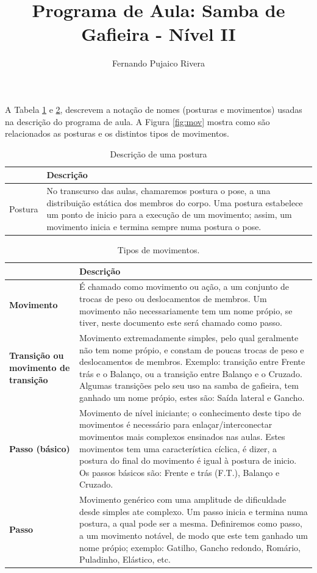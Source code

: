 \documentclass{article}
\title{Programa de Aula: Samba de Gafieira - Nível II}
\author{Fernando Pujaico Rivera}
\date{}
\begin{document}
{\let\newpage\relax\maketitle}
A Tabela \ref{tab:typospos} e \ref {tab:typosmov}, descrevem a notação de nomes  (posturas e movimentos) usadas 
na descrição do programa de aula.
A Figura \ref{fig:mov} mostra como são relacionados as posturas e os distintos tipos de movimentos.


\begin{table}[h]
\centering
\begin{tabular}{|p{3cm}|p{13cm}|}
\hline
~ & Descrição \\  \hline
Postura & No transcurso das aulas, chamaremos postura o pose, a una distribuição estática
dos membros do corpo. Uma postura estabelece um ponto de inicio para a execução de um
movimento; assim, um movimento inicia e termina sempre numa postura o pose.\\ \hline

\end{tabular}
\caption{Descrição de uma postura}
\label{tab:typospos}
\end{table}


\begin{table}[h]
\centering
\begin{tabular}{|p{2.5cm}|p{13.5cm}|}
\hline
~ & Descrição \\  \hline
\textbf{Movimento} & É chamado como movimento ou ação, a um conjunto de trocas de peso ou deslocamentos de membros.
Um movimento não necessariamente tem um nome própio, se tiver, neste documento este será
chamado como passo.\\ \hline
\textbf{Transição ou movimento de transição} &  Movimento extremadamente simples, pelo qual geralmente não tem nome própio,
e constam de poucas trocas de peso e deslocamentos de membros. Exemplo: transição entre Frente trás e o Balanço, 
ou a transição entre Balanço e o Cruzado. Algumas transições
pelo seu uso na samba de gafieira, tem ganhado um nome própio, estes são: Saída lateral e Gancho.\\ \hline
\textbf{Passo (básico)} & Movimento de nível iniciante; o conhecimento deste tipo de
movimentos é necessário para enlaçar/interconectar movimentos mais complexos ensinados nas aulas. Estes
movimentos tem uma característica cíclica, é dizer, a postura do final do movimento 
é igual à postura de inicio. Os passos básicos são: Frente e trás (F.T.), Balanço e Cruzado.\\ \hline
\textbf{Passo} &  Movimento genérico com uma amplitude de dificuldade desde simples ate complexo.
Um passo inicia e termina numa postura, a qual pode ser a mesma. Definiremos como passo, a um movimento
notável, de modo que este tem ganhado um nome própio; exemplo: Gatilho, Gancho redondo, Romário, Puladinho, Elástico, etc. \\ \hline

\end{tabular}
\caption{Tipos de movimentos.}
\label{tab:typosmov}
\end{table}
\end{document}
